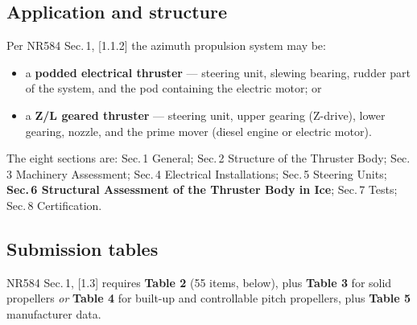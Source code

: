 \documentclass[11pt,a4paper]{report}
\begin{document}
\noindent{}

\subsection{Application and structure}
Per NR584 Sec.\,1, [1.1.2] the azimuth propulsion system may be:
\begin{itemize}[leftmargin=*]
\item a \textbf{podded electrical thruster} --- steering unit, slewing bearing,
rudder part of the system, and the pod containing the electric motor; or
\item a \textbf{Z/L geared thruster} --- steering unit, upper gearing (Z-drive),
lower gearing, nozzle, and the prime mover (diesel engine or electric motor).
\end{itemize}

\noindent The eight sections are: Sec.\,1 General; Sec.\,2 Structure of the
Thruster Body; Sec.\,3 Machinery Assessment; Sec.\,4 Electrical Installations;
Sec.\,5 Steering Units; \textbf{Sec.\,6 Structural Assessment of the Thruster
Body in Ice}; Sec.\,7 Tests; Sec.\,8 Certification.

\subsection{Submission tables}
NR584 Sec.\,1, [1.3] requires \textbf{Table 2} (55 items, below), plus
\textbf{Table 3} for solid propellers \emph{or} \textbf{Table 4} for built-up and
controllable pitch propellers, plus \textbf{Table 5} manufacturer data.
\end{document}
